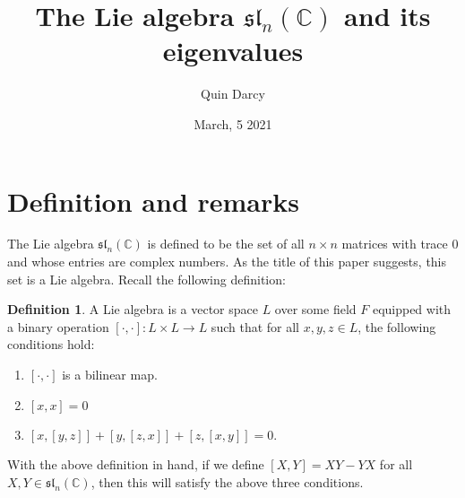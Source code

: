 \documentclass[12pt]{article}
\theoremstyle{definition}
\newtheorem{definition}{Definition}[section]
\theoremstyle{definition}
\begin{document}
\title{The Lie algebra $\mathfrak{sl}_n(\mathbb{C})$ and its eigenvalues}
\author{Quin Darcy}
\date{March, 5 2021}
\maketitle
    \section{Definition and remarks}
    The Lie algebra $\mathfrak{sl}_n(\mathbb{C})$ is defined to be the set of all $n\times
    n$ matrices with trace 0 and whose entries are complex numbers. As the
    title of this paper suggests, this set is a Lie algebra. Recall the
    following definition:
    \begin{definition}
        A Lie algebra is a vector space $L$ over some field $F$ equipped with
        a binary operation $[\cdot, \cdot]:L\times L\to L$ such that for all
        $x, y, z\in L$, the
        following conditions hold:
        \begin{enumerate}[label=(\roman*)]
            \item $[\cdot, \cdot]$ is a bilinear map.
            \item $[x, x] = 0$
            \item $[x, [y, z]]+[y, [z, x]]+[z, [x, y]] = 0$.
            \end{enumerate}
    \end{definition}
    \noindent With the above definition in hand, if we define $[X, Y]
    = XY-YX$ for all $X, Y\in\mathfrak{sl}_n(\mathbb{C})$, then this will
    satisfy the above three conditions.
\end{document}

